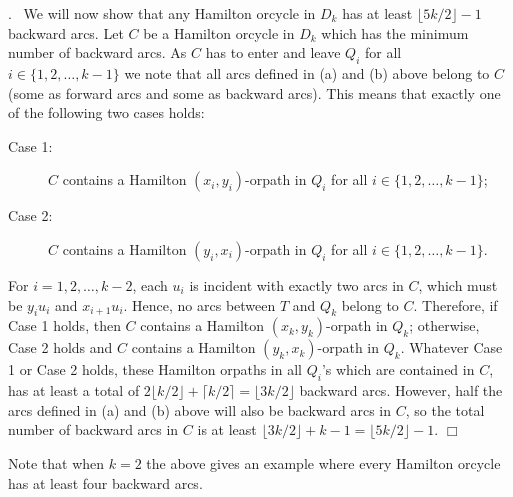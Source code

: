 \documentclass{article}
\newcommand{\2}{\vspace{2mm}}
\renewenvironment{proof}[1][]{\par \noindent {\bf Proof#1}.\ }{\hfill$\Box$
\par \vspace{11pt}}
\theoremstyle{definition}
\begin{document}
\begin{proof}
We will now show that any Hamilton orcycle in $D_k$ has at least $\lfloor 5k/2 \rfloor -1$ backward arcs.
Let $C$ be a Hamilton orcycle in $D_k$ which has the minimum number of backward arcs. As $C$ has to enter and leave $Q_i$ for all $i \in \{1,2,\ldots,k-1\}$ we note
that all arcs defined in (a) and (b) above belong to $C$ (some as forward arcs and some as backward arcs). This means that exactly one of the following two cases holds:

\begin{description}
\item[Case 1:] $C$ contains a Hamilton $(x_i,y_i)$-orpath in $Q_i$ for all $i \in \{1,2,\ldots,k-1\}$;

\item[Case 2:]  $C$ contains a Hamilton $(y_i,x_i)$-orpath in $Q_i$ for all $i \in \{1,2,\ldots,k-1\}$.

\end{description}

For $i=1,2,\dots ,k-2$,  each $u_i$ is incident with exactly two arcs in $C$, which must be  $y_i u_i$ and $x_{i+1} u_i$. Hence, no arcs between $T$ and $Q_k$ belong to $C$. Therefore, if Case 1 holds, then $C$ contains
a Hamilton $(x_k,y_k)$-orpath in $Q_k$; otherwise, Case 2 holds and $C$ contains a Hamilton $(y_k,x_k)$-orpath in $Q_k$. Whatever Case 1 or Case 2 holds, these Hamilton orpaths in all $Q_i$'s which are contained in $C$, has at least a total of $2\lfloor k/2 \rfloor + \lceil k/2 \rceil=\lfloor 3k/2 \rfloor$ backward arcs.
However, half the arcs defined in (a) and (b) above will also be backward arcs in $C$, so the total number of backward arcs in $C$ is at least $\lfloor 3k/2 \rfloor + k-1 = \lfloor 5k/2 \rfloor -1$.
\end{proof}

Note that when $k=2$ the above gives an example where every Hamilton orcycle has at least four backward arcs.
\end{document}
